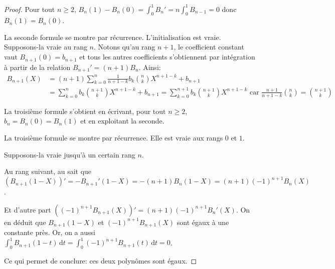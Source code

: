 \begin{proof}
Pour tout $n \geq 2$, $B_n(1) - B_n(0) = \displaystyle{\int_0^1} B_n' = n \displaystyle{\int_0^1} B_{n-1} = 0$ donc $B_n(1) = B_n(0)$.

\medskip
La seconde formule se montre par récurrence. L'initialisation est vraie. Supposons-la vraie au rang $n$. Notons qu'au rang $n+1$, le coefficient constant vaut $B_{n+1}(0) = b_{n+1}$ et tous les autres coefficients s'obtiennent par intégration à partir de la relation $B_{n+1}' = (n+1)B_n$. Ainsi:
\begin{align*}
B_{n+1}(X) & = (n+1) \displaystyle{\sum_{k=0}^n} \frac{1}{n+1-k} b_k {n \choose k} X^{n+1-k} + b_{n+1} \\ & = \displaystyle{\sum_{k=0}^n} b_k {n+1 \choose k} X^{n+1-k} + b_{n+1} = \displaystyle{\sum_{k=0}^{n+1}} b_k {n+1 \choose k} X^{n+1-k} \text{ car } \frac{n+1}{n+1-k} {n \choose k} = {n+1 \choose k}
\end{align*}

\medskip
La troisième formule s'obtient en écrivant, pour tout $n \geq 2$, $b_n = B_n(0) = B_n(1)$ et en exploitant la seconde.

\medskip
La troisième formule se montre par récurrence. Elle est vraie aux rangs $0$ et $1$.

\medskip
Supposons-la vraie jusqu'à un certain rang $n$. 

Au rang suivant, au sait que $\left (B_{n+1}(1-X)\right )' = -B_{n+1}'(1-X) = -(n+1) B_n(1-X) = (n+1) (-1)^{n+1}B_n(X)$. 

Et d'autre part $\left ((-1)^{n+1}B_{n+1}(X)\right )' = (n+1)(-1)^{n+1}B_n'(X)$. On en déduit que $B_{n+1}(1-X)$ et $(-1)^{n+1}B_{n+1}(X)$ sont égaux à une constante près. Or, on a aussi $\displaystyle{\int_0^1}B_{n+1}(1-t) \, \mathrm d t = \displaystyle{\int_0^1}(-1)^{n+1} B_{n+1}(t) \, \mathrm d t = 0$. 

Ce qui permet de conclure: ces deux polynômes sont égaux.



\end{proof}
